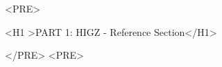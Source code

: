 
\makeindex
\setlongtables
\PScommands%
\let\Iind\Ropt
\pagestyle{empty}
\renewcommand{\ding}[1]{DING(#1)}
\renewcommand{\Symb}[1]{SYMB(#1)}
\PScommands
\newcommand{\Oind}[1]{#1}
\newcommand{\Sind}[1]{#1}
\newcommand{\IQUEST}{/IQUEST/}
\newcommand{\QUEST}{QUEST}
\newcommand{\Em}[1]{#1}%
 

\def\BIBFILE{H1Bibliography}


<PRE>


<H1 >PART 1: HIGZ - Reference Section</H1>


</PRE>
<PRE>


